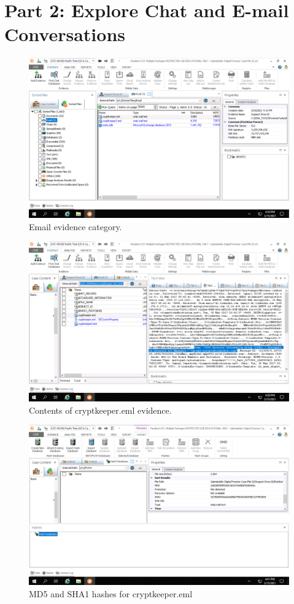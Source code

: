 \section*{Part 2: Explore Chat and E-mail Conversations}
\begin{figure}[H]
    \centering
    \includegraphics[width=\linewidth]{figures/2-1.png}
    \caption{Email evidence category.}
\end{figure}

\begin{figure}[H]
    \centering
    \includegraphics[width=\linewidth]{figures/2-6.png}
    \caption{Contents of cryptkeeper.eml evidence.}
\end{figure}

\begin{figure}[H]
    \centering
    \includegraphics[width=\linewidth]{figures/2-7.png}
    \caption{MD5 and SHA1 hashes for cryptkeeper.eml}
\end{figure}

